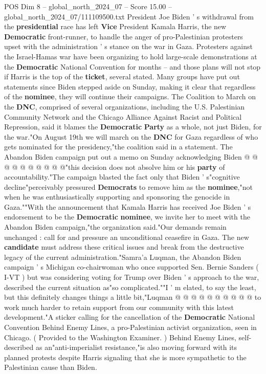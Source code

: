 \begin{textsample}{POS Dim 8 – global\_north\_2024\_07 – Score 15.00 – global\_north\_2024\_07/111109500.txt}  \label{ex:f8_pos_041}
President Joe Biden ' s withdrawal from the \textbf{presidential} race has left \textbf{Vice} President Kamala Harris, the new \textbf{Democratic} front-runner, to handle the anger of pro-Palestinian protesters upset with the administration ' s stance on the war in Gaza.
Protesters against the Israel-Hamas war have been organizing to hold large-scale demonstrations at the \textbf{Democratic} National Convention for months -- and those plans will not stop if Harris is the top of the \textbf{ticket}, several stated.
Many groups have put out statements since Biden stepped aside on Sunday, making it clear that regardless of the \textbf{nominee}, they will continue their campaigns.
The Coalition to March on the \textbf{DNC}, comprised of several organizations, including the U.S.
Palestinian Community Network and the Chicago Alliance Against Racist and Political Repression, said it blames the \textbf{Democratic} \textbf{Party} as a whole, not just Biden, for the war."On August 19th we will march on the \textbf{DNC} for Gaza regardless of who gets nominated for the presidency,"the coalition said in a statement.
The Abandon Biden campaign put out a memo on Sunday acknowledging Biden @ @ @ @ @ @ @ @ @ @"this decision does not absolve him or his \textbf{party} of accountability."The campaign blasted the fact only that Biden ' s"cognitive decline"perceivably pressured \textbf{Democrats} to remove him as the \textbf{nominee},"not when he was enthusiastically supporting and sponsoring the genocide in Gaza.""With the announcement that Kamala Harris has received Joe Biden ' s endorsement to be the \textbf{Democratic} \textbf{nominee}, we invite her to meet with the Abandon Biden campaign,"the organization said."Our demands remain unchanged : call for and pressure an unconditional ceasefire in Gaza.
The new \textbf{candidate} must address these critical issues and break from the destructive legacy of the current administration."Samra'a Luqman, the Abandon Biden campaign ' s Michigan co-chairwoman who once supported Sen.
Bernie Sanders ( I-VT ) but was considering voting for Trump over Biden ' s approach to the war, described the current situation as"so complicated.""I ' m elated, to say the least, but this definitely changes things a little bit,"Luqman @ @ @ @ @ @ @ @ @ @ to work much harder to retain support from our community with this latest development."A sticker calling for the cancellation of the \textbf{Democratic} National Convention Behind Enemy Lines, a pro-Palestinian activist organization, seen in Chicago. ( Provided to the Washington Examiner. ) Behind Enemy Lines, self-described as an"anti-imperialist resistance,"is also moving forward with its planned protests despite Harris signaling that she is more sympathetic to the Palestinian cause than Biden.

\end{textsample}

